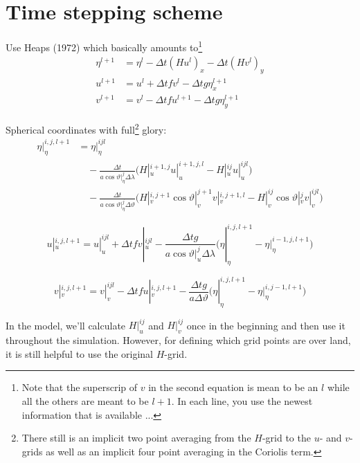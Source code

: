 \documentclass[a4paper]{article}
\begin{document}

\section{Time stepping scheme}

Use Heaps (1972) which basically amounts to\footnote{Note that the superscrip
of $v$ in the second equation is mean to be an $l$ while all the others are meant
to be $l+1$. In each line, you use the newest information that is available ...}
\begin{align}
  \eta^{l+1} & = \eta^l - \Delta t (Hu^l)_x - \Delta t (Hv^l)_y \\
  u^{l+1} & = u^l + \Delta t f v^l - \Delta t g \eta^{l+1}_x \\
  v^{l+1} & = v^l - \Delta t f u^{l+1} - \Delta t g \eta^{l+1}_y
\end{align}

Spherical coordinates with full\footnote{There still is an implicit two point
averaging from the $H$-grid to the $u$- and $v$-grids as well as an implicit
four point averaging in the Coriolis term.} glory:
\begin{equation}
  \begin{split}
    \eta|_\eta^{i,j,l+1} & = \eta|_\eta^{ijl} \\
    & \quad - \frac{\Delta t}{a\cos\vartheta|_\eta^{j}\Delta\lambda}
      \Biggl(H|_u^{i+1,j} u|_u^{i+1,j,l} - H|_u^{ij}u|_u^{ijl}\Biggr) \\
    & \quad - \frac{\Delta t}{a\cos\vartheta|_\eta^{j}\Delta\vartheta}  
      \Biggl(H|_v^{i,j+1}\cos\vartheta|_v^{j+1}v|_v^{i,j+1,l} - H|_v^{ij}\cos\vartheta|_v^{j}v|_v^{ijl}\Biggr)
  \end{split}
\end{equation}

\begin{equation}
  u|_u^{i,j,l+1} = u|_u^{ijl} 
    + \Delta t f v|_u^{ijl}
    - \frac{\Delta t g}{a\cos\vartheta|_u^j\Delta\lambda}
      \Biggl(\eta|_\eta^{i,j,l+1} - \eta|_\eta^{i-1,j,l+1}\Biggr)
\end{equation}

\begin{equation}
  v|_v^{i,j,l+1} = v|_v^{ijl} 
    - \Delta t f u|_v^{i,j,l+1} 
    - \frac{\Delta t g}{a\Delta\vartheta}
      \Biggl(\eta|_\eta^{i,j,l+1} - \eta|_\eta^{i,j-1,l+1}\Biggr)
\end{equation}

In the model, we'll calculate $H|_u^{ij}$ and $H|_v^{ij}$ once in the beginning and
then use it throughout the simulation. However, for defining which grid points are 
over land, it is still helpful to use the original $H$-grid.
\end{document}
